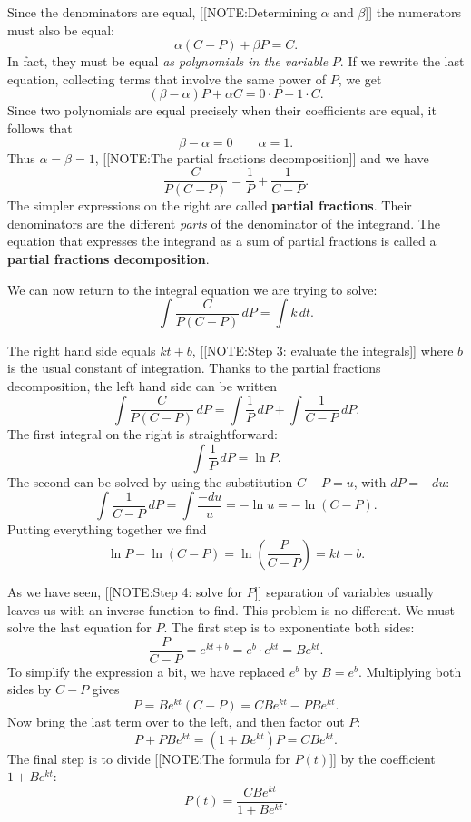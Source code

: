 Since the denominators are equal, 
[[NOTE:Determining   $\alpha$ and $\beta$]]
the numerators must also be equal:
	\[
\alpha (C - P) + \beta P = C.
\]
In fact, they must be equal {\em as polynomials in the variable\/} $P$.  If we rewrite the last equation, collecting terms that involve the same power of $P$, we get 	\[
(\beta - \alpha)P + \alpha C = 0 \cdot P + 1 \cdot C.
\]
Since two polynomials are equal precisely when their coefficients are
equal, it follows that
	\[
\beta - \alpha = 0 \qquad \alpha = 1.
\]
Thus $\alpha = \beta = 1$, 
[[NOTE:The partial fractions decomposition]]
and we have 
	\[
\dfrac{C}{P(C - P)} = \dfrac{1}{P} + \dfrac{1}{C - P}.
\]
The simpler expressions on the right are called {\bf partial
  fractions}. Their denominators are the
different {\em parts\/} of the denominator of the integrand.  The
equation that expresses the integrand as a sum of partial fractions is
called a {\bf partial fractions decomposition}.



We can now return to the integral equation we are trying to solve:
	\[
\int \dfrac{C}{P(C - P)} \, dP  = \int k \, dt.
\]




The right hand side equals $kt	+ b$, 
[[NOTE:Step 3: evaluate  the integrals]]
where $b$ is the usual constant of integration.  Thanks to the partial
fractions decomposition, the left hand side can be written
	\[
\int \dfrac{C}{P(C - P)} \, dP  = \int \dfrac{1}{P} \, dP + 
		\int \dfrac{1}{C - P} \, dP.
\]
The first integral on the right is straightforward:
	\[
\int \dfrac{1}{P} \, dP = \ln{P}.
\]
The second can be solved by using the substitution $C - P = u$, with
$dP = -du$:
	\[
\int \dfrac{1}{C - P} \, dP = \int \dfrac{-du}{u} = 
		- \ln{u} = -\ln(C - P).
\]
Putting everything together we find
	\[
\ln{P} - \ln(C - P) = \ln \left( \dfrac{P}{C - P} \right) = kt + b.
\]

As we have seen, 
[[NOTE:Step 4:  solve for $P$]]	
separation of variables usually leaves us with an inverse function to
find.  This problem is no different.  We must solve the last equation
for $P$.  The first step is to exponentiate both sides:
	\[
\dfrac{P}{C - P} = e^{kt + b} = e^b \cdot e^{kt} = Be^{kt}.
\]
To simplify the expression a bit, we have replaced $e^b$ by $B = e^b$.
Multiplying both sides by $C - P$ gives
	\[
P = Be^{kt}(C - P) = CBe^{kt} - PBe^{kt}.
\]
Now bring the last term over to the left, and then factor out $P$:
	\[
P + PBe^{kt} = \left( 1 + Be^{kt} \right) P = CBe^{kt}.
\]
The final step is to divide 
[[NOTE:The formula for $P(t)$]]
by the coefficient $1 + Be^{kt}$:
	\[
P(t) = \dfrac{CBe^{kt}}{1 + Be^{kt}}.
\]


